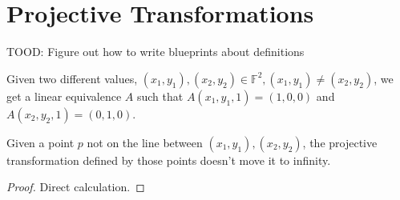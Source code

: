 \chapter{Projective Transformations}
\label{chap:proj}

TOOD: Figure out how to write blueprints about definitions

\begin{definition}
    \label{projective_transform}
    \leanok
    Given two different values, $(x_1, y_1), (x_2, y_2) \in \mathbb{F}^2, (x_1, y_1) \neq (x_2, y_2)$, we get a linear equivalence $A$ such that
    $A (x_1, y_1, 1) = (1, 0, 0)$ and $A (x_2, y_2, 1) = (0, 1, 0)$.
\end{definition}

\begin{lemma}
    \label{non_erasing}
    \leanok
    Given a point $p$ not on the line between $(x_1, y_1), (x_2, y_2)$, the projective transformation defined
    by those points doesn't move it to infinity.
\end{lemma}

\begin{proof}
    Direct calculation.
\end{proof}